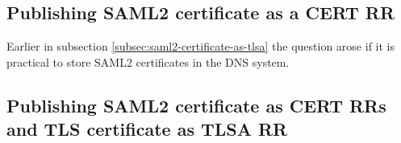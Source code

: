 
\subsection{Publishing SAML2 certificate as a CERT RR}
Earlier in subsection \ref{subsec:saml2-certificate-as-tlsa} the question arose if it is practical to store SAML2 certificates in the DNS system.

\subsection{Publishing SAML2 certificate as CERT RRs and TLS certificate as TLSA RR}



